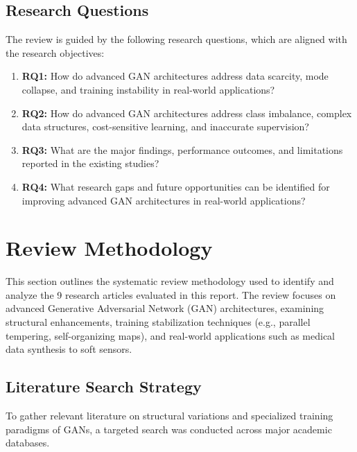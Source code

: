 \documentclass[12pt,a4paper]{article}
\begin{document}
\subsection{Research Questions}

The review is guided by the following research questions, which are aligned with the research objectives: 

\begin{enumerate} 
\item \textbf{RQ1:} How do advanced GAN architectures address data scarcity, mode collapse, and training instability in real-world applications? 
\item \textbf{RQ2:} How do advanced GAN architectures address class imbalance, complex data structures, cost-sensitive learning, and inaccurate supervision? 
\item \textbf{RQ3:} What are the major findings, performance outcomes, and limitations reported in the existing studies? 
\item \textbf{RQ4:} What research gaps and future opportunities can be identified for improving advanced GAN architectures in real-world applications? 
\end{enumerate}

\clearpage

\section{Review Methodology}

This section outlines the systematic review methodology used to identify and analyze the 9 research articles evaluated in this report. The review focuses on advanced Generative Adversarial Network (GAN) architectures, examining structural enhancements, training stabilization techniques (e.g., parallel tempering, self-organizing maps), and real-world applications such as medical data synthesis to soft sensors.

\subsection{Literature Search Strategy}

To gather relevant literature on structural variations and specialized training paradigms of GANs, a targeted search was conducted across major academic databases.
\end{document}
